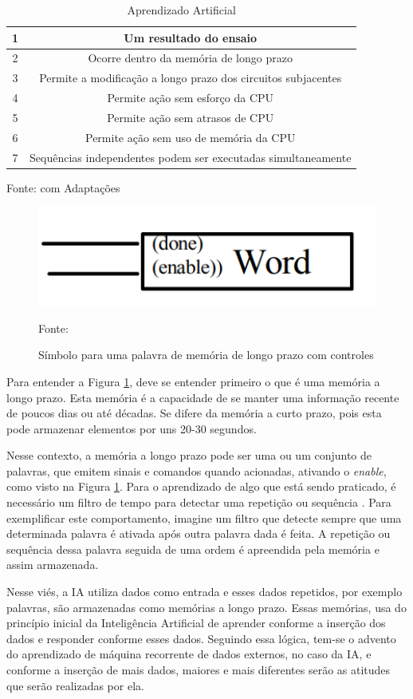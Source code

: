 \begin{table}[H]
\centering
\begin{tabular}{|c|c|}
\hline
1 & Um resultado do ensaio                    \\ \hline
2 & Ocorre dentro da memória de longo prazo \\ \hline
3 & Permite a modificação a longo prazo dos circuitos subjacentes \\ \hline
4 & Permite ação sem esforço da CPU \\ \hline
5 & Permite ação sem atrasos de CPU \\ \hline
6 & Permite ação sem uso de memória da CPU \\ \hline
7 & Sequências independentes podem ser executadas simultaneamente \\ \hline
\end{tabular}
\caption{Aprendizado Artificial}
Fonte: \cite{john} com Adaptações
\label{tab:artificialtraduzido}
\end{table}

\begin{figure}[H]
		\centering
		\includegraphics[width=14.5cm]{figuras/sinaisdememoria}
        \caption{Símbolo para uma palavra de memória de longo prazo com controles}
        Fonte: \cite{john}
		\label{img:palavra}
\end{figure}

Para entender a Figura \ref{img:palavra}, deve se entender primeiro o que é uma memória a longo prazo. Esta memória é a capacidade de se manter uma informação recente de poucos dias ou até décadas. Se difere da memória a curto prazo, pois esta pode armazenar elementos por uns 20-30 segundos.

Nesse contexto, a memória a longo prazo pode ser uma ou um conjunto de palavras, que emitem sinais e comandos quando acionadas, ativando o \textit{enable}, como visto na Figura \ref{img:palavra}. Para o aprendizado de algo que está sendo praticado, é necessário um filtro de tempo para detectar uma repetição ou sequência \cite{john}. Para exemplificar este comportamento, imagine um filtro que detecte sempre que uma determinada palavra é ativada após outra palavra dada é feita. A repetição ou sequência dessa palavra seguida de uma ordem é apreendida pela memória e assim armazenada.

Nesse viés, a IA utiliza dados como entrada e esses dados repetidos, por exemplo palavras, são armazenadas como memórias a longo prazo. Essas memórias, usa do princípio inicial da Inteligência Artificial de aprender conforme a inserção dos dados e responder conforme esses dados. Seguindo essa lógica, tem-se o advento do aprendizado de máquina recorrente de dados externos, no caso da IA, e conforme a inserção de mais dados, maiores e mais diferentes serão as atitudes que serão realizadas por ela.